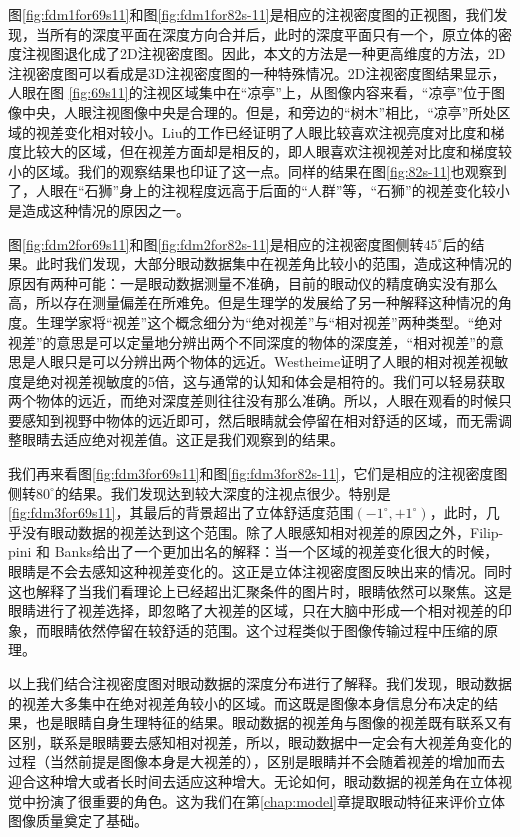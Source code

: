 图\ref{fig:fdm1for69s11}和图\ref{fig:fdm1for82s-11}是相应的注视密度图的正视图，我们发现，当所有的深度平面在深度方向合并后，此时的深度平面只有一个，原立体的密度注视图退化成了2D注视密度图。因此，本文的方法是一种更高维度的方法，2D注视密度图可以看成是3D注视密度图的一种特殊情况。2D注视密度图结果显示，人眼在图 \ref{fig:69s11}的注视区域集中在“凉亭”上，从图像内容来看，“凉亭”位于图像中央，人眼注视图像中央是合理的。但是，和旁边的“树木”相比，“凉亭”所处区域的视差变化相对较小。Liu\parencite{liu2010scene}的工作已经证明了人眼比较喜欢注视亮度对比度和梯度比较大的区域，但在视差方面却是相反的，即人眼喜欢注视视差对比度和梯度较小的区域。我们的观察结果也印证了这一点。同样的结果在图\ref{fig:82s-11}也观察到了，人眼在“石狮”身上的注视程度远高于后面的“人群”等，“石狮”的视差变化较小是造成这种情况的原因之一。

图\ref{fig:fdm2for69s11}和图\ref{fig:fdm2for82s-11}是相应的注视密度图侧转${45^ \circ }$后的结果。此时我们发现，大部分眼动数据集中在视差角比较小的范围，造成这种情况的原因有两种可能：一是眼动数据测量不准确，目前的眼动仪的精度确实没有那么高，所以存在测量偏差在所难免。但是生理学的发展给了另一种解释这种情况的角度。生理学家将“视差”这个概念细分为“绝对视差”与“相对视差”两种类型。“绝对视差”的意思是可以定量地分辨出两个不同深度的物体的深度差，“相对视差”的意思是人眼只是可以分辨出两个物体的远近。Westheime\parencite{westheimer1979cooperative}证明了人眼的相对视差视敏度是绝对视差视敏度的5倍，这与通常的认知和体会是相符的。我们可以轻易获取两个物体的远近，而绝对深度差则往往没有那么准确。所以，人眼在观看的时候只要感知到视野中物体的远近即可，然后眼睛就会停留在相对舒适的区域，而无需调整眼睛去适应绝对视差值。这正是我们观察到的结果。

我们再来看图\ref{fig:fdm3for69s11}和图\ref{fig:fdm3for82s-11}，它们是相应的注视密度图侧转${80^ \circ }$的结果。我们发现达到较大深度的注视点很少。特别是\ref{fig:fdm3for69s11}，其最后的背景超出了立体舒适度范围$( - 1^\circ , + 1^\circ )$，此时，几乎没有眼动数据的视差达到这个范围。除了人眼感知相对视差的原因之外，Filip- pini 和 Banks\parencite{filippini2009limits}给出了一个更加出名的解释：当一个区域的视差变化很大的时候，眼睛是不会去感知这种视差变化的。这正是立体注视密度图反映出来的情况。同时这也解释了当我们看理论上已经超出汇聚条件的图片时，眼睛依然可以聚焦。这是眼睛进行了视差选择，即忽略了大视差的区域，只在大脑中形成一个相对视差的印象，而眼睛依然停留在较舒适的范围。这个过程类似于图像传输过程中压缩的原理。

以上我们结合注视密度图对眼动数据的深度分布进行了解释。我们发现，眼动数据的视差大多集中在绝对视差角较小的区域。而这既是图像本身信息分布决定的结果，也是眼睛自身生理特征的结果。眼动数据的视差角与图像的视差既有联系又有区别，联系是眼睛要去感知相对视差，所以，眼动数据中一定会有大视差角变化的过程（当然前提是图像本身是大视差的），区别是眼睛并不会随着视差的增加而去迎合这种增大或者长时间去适应这种增大。无论如何，眼动数据的视差角在立体视觉中扮演了很重要的角色。这为我们在第\ref{chap:model}章提取眼动特征来评价立体图像质量奠定了基础。

